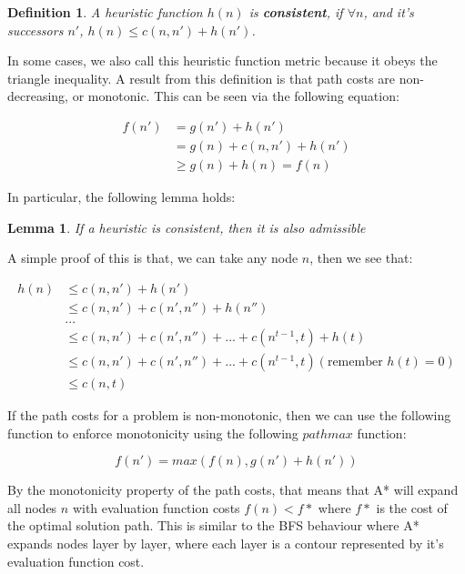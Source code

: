\documentclass[12pt]{article}
\newtheorem{definition}{Definition}
\newtheorem{lemma}{Lemma}
\begin{document}
\begin{definition}
A heuristic function $h(n)$ is \textbf{consistent}, if $\forall n$, and it's successors $n'$, $h(n) \leq c(n, n') + h(n')$.
\end{definition}

In some cases, we also call this heuristic function metric because it obeys the triangle inequality. A result from this definition is that path costs are non-decreasing, or monotonic. This can be seen via the following equation:

\begin{equation*}
\begin{aligned}
f(n') & = g(n') + h(n') \\
& = g(n) + c(n, n') + h(n') \\
& \geq g(n) + h(n) = f(n)
\end{aligned}
\end{equation*}

In particular, the following lemma holds:

\begin{lemma}
If a heuristic is consistent, then it is also admissible
\end{lemma}

A simple proof of this is that, we can take any node $n$, then we see that:

\begin{equation*}
\begin{aligned}
h(n) & \leq c(n, n') + h(n')\\
& \leq c(n, n') + c(n', n'') + h(n'') \\
& ...\\
& \leq c(n, n') + c(n', n'') + ... + c(n^{t-1}, t) + h(t) \\
& \leq c(n, n') + c(n', n'') + ... + c(n^{t-1}, t) (\text{remember $h(t) = 0$})\\
& \leq c(n, t)
\end{aligned}
\end{equation*}

If the path costs for a problem is non-monotonic, then we can use the following function to enforce monotonicity using the following $pathmax$ function:

\begin{equation*}
f(n') = max(f(n), g(n') + h(n'))
\end{equation*}

By the monotonicity property of the path costs, that means that A* will expand all nodes $n$ with evaluation function costs $f(n) < f*$ where $f*$ is the cost of the optimal solution path. This is similar to the BFS behaviour where A* expands nodes layer by layer, where each layer is a contour represented by it's evaluation function cost.
\end{document}
